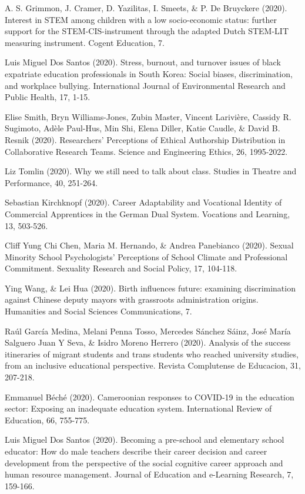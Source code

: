 \documentclass[runningheads]{llncs}
\begin{document}
\begin{multicols}{2}
A. S. Grimmon, J. Cramer, D. Yazilitas, I. Smeets, \& P. De Bruyckere (2020). Interest in STEM among children with a low socio-economic status: further support for the STEM-CIS-instrument through the adapted Dutch STEM-LIT measuring instrument. Cogent Education, 7.

Luis Miguel Dos Santos (2020). Stress, burnout, and turnover issues of black expatriate education professionals in South Korea: Social biases, discrimination, and workplace bullying. International Journal of Environmental Research and Public Health, 17, 1-15.

Elise Smith, Bryn Williams-Jones, Zubin Master, Vincent Larivière, Cassidy R. Sugimoto, Adèle Paul-Hus, Min Shi, Elena Diller, Katie Caudle, \& David B. Resnik (2020). Researchers’ Perceptions of Ethical Authorship Distribution in Collaborative Research Teams. Science and Engineering Ethics, 26, 1995-2022.

Liz Tomlin (2020). Why we still need to talk about class. Studies in Theatre and Performance, 40, 251-264.

Sebastian Kirchknopf (2020). Career Adaptability and Vocational Identity of Commercial Apprentices in the German Dual System. Vocations and Learning, 13, 503-526.

Cliff Yung Chi Chen, Maria M. Hernando, \& Andrea Panebianco (2020). Sexual Minority School Psychologists’ Perceptions of School Climate and Professional Commitment. Sexuality Research and Social Policy, 17, 104-118.

Ying Wang, \& Lei Hua (2020). Birth influences future: examining discrimination against Chinese deputy mayors with grassroots administration origins. Humanities and Social Sciences Communications, 7.

Raúl García Medina, Melani Penna Tosso, Mercedes Sánchez Sáinz, José María Salguero Juan Y Seva, \& Isidro Moreno Herrero (2020). Analysis of the success itineraries of migrant students and trans students who reached university studies, from an inclusive educational perspective. Revista Complutense de Educacion, 31, 207-218.

Emmanuel Béché (2020). Cameroonian responses to COVID-19 in the education sector: Exposing an inadequate education system. International Review of Education, 66, 755-775.

Luis Miguel Dos Santos (2020). Becoming a pre-school and elementary school educator: How do male teachers describe their career decision and career development from the perspective of the social cognitive career approach and human resource management. Journal of Education and e-Learning Research, 7, 159-166.


\end{multicols}
\end{document}
